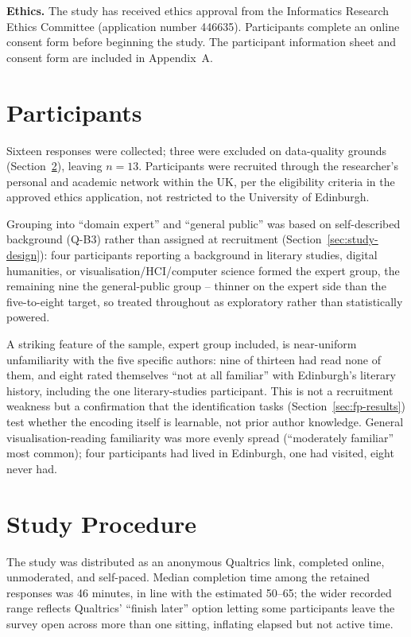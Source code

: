 \documentclass[logo,msc]{infthesis}
\begin{document}
\textbf{Ethics.} The study has received ethics approval from the Informatics Research Ethics Committee (application number 446635). Participants complete an online consent form before beginning the study. The participant information sheet and consent form are included in Appendix~A.
 
\section{Participants}

Sixteen responses were collected; three were excluded on data-quality grounds (Section~\ref{sec:study-procedure}), leaving $n=13$. Participants were recruited through the researcher's personal and academic network within the UK, per the eligibility criteria in the approved ethics application, not restricted to the University of Edinburgh.

Grouping into ``domain expert'' and ``general public'' was based on self-described background (Q-B3) rather than assigned at recruitment (Section~\ref{sec:study-design}): four participants reporting a background in literary studies, digital humanities, or visualisation/HCI/computer science formed the expert group, the remaining nine the general-public group -- thinner on the expert side than the five-to-eight target, so treated throughout as exploratory rather than statistically powered.

A striking feature of the sample, expert group included, is near-uniform unfamiliarity with the five specific authors: nine of thirteen had read none of them, and eight rated themselves ``not at all familiar'' with Edinburgh's literary history, including the one literary-studies participant. This is not a recruitment weakness but a confirmation that the identification tasks (Section~\ref{sec:fp-results}) test whether the encoding itself is learnable, not prior author knowledge. General visualisation-reading familiarity was more evenly spread (``moderately familiar'' most common); four participants had lived in Edinburgh, one had visited, eight never had.

\section{Study Procedure}
\label{sec:study-procedure}

The study was distributed as an anonymous Qualtrics link, completed online, unmoderated, and self-paced. Median completion time among the retained responses was 46 minutes, in line with the estimated 50--65; the wider recorded range reflects Qualtrics' ``finish later'' option letting some participants leave the survey open across more than one sitting, inflating elapsed but not active time.
\end{document}
